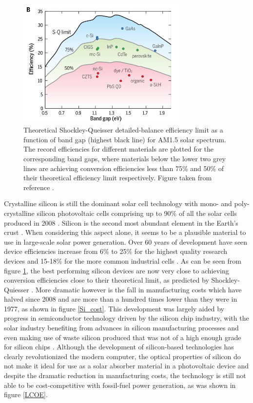 \documentclass[11pt, twoside]{report}
\begin{document}
\begin{figure}[h!]
  \centering
    \includegraphics[width=0.75\textwidth]{figures/SQ_new.png}
    \caption{Theoretical Shockley-Queisser detailed-balance efficiency limit \cite{SQ_1961} as a function of band gap (highest black line) for AM1.5 solar spectrum. The record efficiencies for different materials are plotted for the corresponding band gaps, where materials below the lower two grey lines are achieving conversion efficiencies less than 75\% and 50\% of their theoretical efficiency limit respectively. Figure taken from reference .}
  \label{SQ}
\end{figure}

Crystalline silicon is still the dominant solar cell technology with mono- and poly-crystalline silicon photovoltaic cells comprising up to 90\% of all the solar cells produced in 2008  \cite{Si_rev}. Silicon is the second most abundant element in the Earth's crust \cite{Si_abundance}. When considering this aspect alone, it seems to be a plausible material to use in large-scale solar power generation. Over 60 years of development have seen device efficiencies increase from 6\% to 25\% for the highest quality research devices and 15-18\% for the more common industrial cells \cite{Si_rev}. As can be seen from figure \ref{SQ}, the best performing silicon devices are now very close to achieving conversion efficiencies close to their theoretical limit, as predicted by Shockley-Quiesser \cite{SQ_1961}. More dramatic however is the fall in manufacturing costs which have halved since 2008 and are more than a hundred times lower than they were in 1977, as shown in figure \ref{Si_cost}. This development was largely aided by progress in semiconductor technology driven by the silicon chip industry, with the solar industry benefiting from advances in silicon manufacturing processes and even making use of waste silicon produced that was not of a high enough grade for silicon chips \cite{PV_history1}. Although the development of silicon-based technologies has clearly revolutionized the modern computer, the optical properties of silicon do not make it ideal for use as a solar absorber material in a photovoltaic device and despite the dramatic reduction in manufacturing costs, the technology is still not able to be cost-competitive with fossil-fuel power generation, as was shown in figure \ref{LCOE}.
\end{document}
